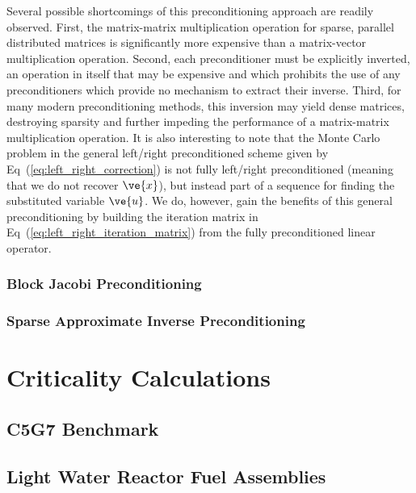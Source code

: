 \documentclass[letterpaper,11pt]{article}
\begin{document}
Several possible shortcomings of this preconditioning approach are
readily observed. First, the matrix-matrix multiplication operation
for sparse, parallel distributed matrices is significantly more
expensive than a matrix-vector multiplication operation. Second, each
preconditioner must be explicitly inverted, an operation in itself
that may be expensive and which prohibits the use of any
preconditioners which provide no mechanism to extract their
inverse. Third, for many modern preconditioning methods, this
inversion may yield dense matrices, destroying sparsity and further
impeding the performance of a matrix-matrix multiplication
operation. It is also interesting to note that the Monte Carlo problem
in the general left/right preconditioned scheme given by
Eq~(\ref{eq:left_right_correction}) is not fully left/right
preconditioned (meaning that we do not recover $\ve{x}$), but instead
part of a sequence for finding the substituted variable $\ve{u}$. We
do, however, gain the benefits of this general preconditioning by
building the iteration matrix in
Eq~(\ref{eq:left_right_iteration_matrix}) from the fully
preconditioned linear operator.

\subsubsection{Block Jacobi Preconditioning}

\subsubsection{Sparse Approximate Inverse Preconditioning}

\section{Criticality Calculations}

\subsection{C5G7 Benchmark}

\subsection{Light Water Reactor Fuel Assemblies}

\end{document}
